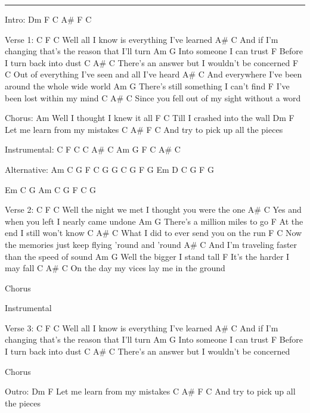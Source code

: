 \noindent\rule{\columnwidth}{1pt}

\begin{multicols}{2}
\begin{lstsong}
Intro: Dm F C A# F C

Verse 1:
C                 F               C
Well all I know is everything I've learned
                                A#          C
And if I'm changing that's the reason that I'll turn
   Am             G
Into someone I can trust
        F
Before I turn back into dust
          C            A#          C
There's an answer but I wouldn't be concerned
                      F                 C
Out of everything I've seen and all I've heard
                        A#               C
And everywhere I've been around the whole wide world
      Am                       G
There's still something I can't find
         F
I've been lost within my mind
         C              A#            C
Since you fell out of my sight without a word
 
Chorus:
      Am
Well I thought I knew it all
      F                C
Till I crashed into the wall
Dm                  F
Let me learn from my mistakes
                          C        A# F C
And try to pick up all the pieces

Instrumental:
C F C
C A# C
Am G F
C A# C

Alternative: Am C G F C G
G C G  F G
Em D C  G F G

Em    C   G
Am    C   G   F C G
\end{lstsong}
\columnbreak
\phantom{a}
\begin{lstsong}
Verse 2:
C                    F             C
Well the night we met I thought you were the one
                       A#          C
Yes and when you left I nearly came undone
      Am                  G
There's a million miles to go
      F
At the end I still won't know
          C       A#              C
What I did to ever send you on the run
                          F                 C
Now the memories just keep flying 'round and 'round
                            A#            C
And I'm traveling faster than the speed of sound
       Am              G
Well the bigger I stand tall
        F
It's the harder I may fall
      C                A#        C
On the day my vices lay me in the ground

Chorus

Instrumental 

Verse 3:
C                 F               C
Well all I know is everything I've learned
                               A#           C
And if I'm changing that's the reason that I'll turn
   Am             G
Into someone I can trust
        F
Before I turn back into dust
          C            A#          C
There's an answer but I wouldn't be concerned

Chorus

Outro:
Dm                  F
Let me learn from my mistakes
                          C        A# F C
And try to pick up all the pieces
\end{lstsong}
\end{multicols}
\newpage

